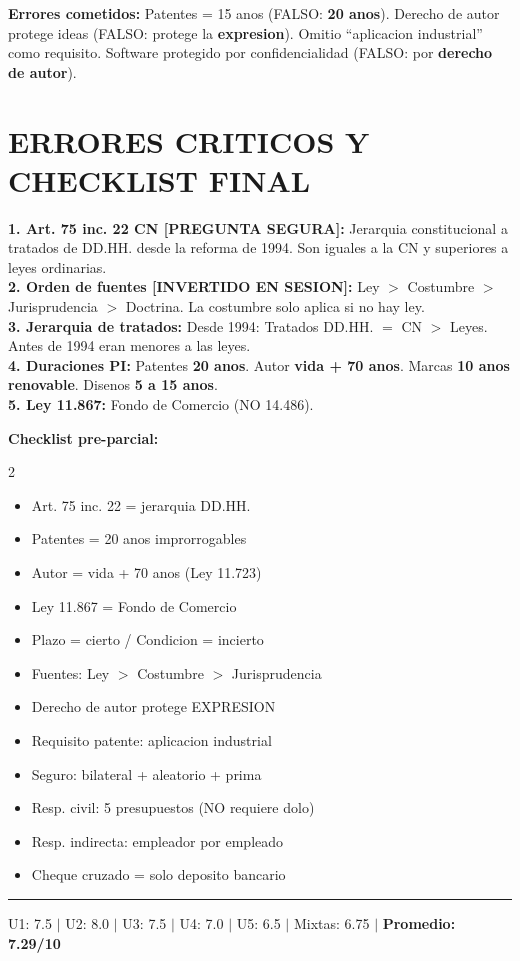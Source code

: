 \documentclass[10pt, a4paper]{article}
\newcommand{\mal}[1]{\textbf{\color{rojo}#1}}
\begin{document}
\begin{cajaError}
\mal{Errores cometidos:} Patentes = 15 anos (FALSO: \textbf{20 anos}). Derecho de autor protege ideas (FALSO: protege la \textbf{expresion}). Omitio ``aplicacion industrial'' como requisito. Software protegido por confidencialidad (FALSO: por \textbf{derecho de autor}).
\end{cajaError}

\section*{ERRORES CRITICOS Y CHECKLIST FINAL}

\begin{cajaError}
\mal{1. Art. 75 inc. 22 CN [PREGUNTA SEGURA]:} Jerarquia constitucional a tratados de DD.HH. desde la reforma de 1994. Son iguales a la CN y superiores a leyes ordinarias.\\
\mal{2. Orden de fuentes [INVERTIDO EN SESION]:} Ley $>$ Costumbre $>$ Jurisprudencia $>$ Doctrina. La costumbre solo aplica si no hay ley.\\
\mal{3. Jerarquia de tratados:} Desde 1994: Tratados DD.HH. $=$ CN $>$ Leyes. Antes de 1994 eran menores a las leyes.\\
\mal{4. Duraciones PI:} Patentes \textbf{20 anos}. Autor \textbf{vida + 70 anos}. Marcas \textbf{10 anos renovable}. Disenos \textbf{5 a 15 anos}.\\
\mal{5. Ley 11.867:} Fondo de Comercio (NO 14.486).
\end{cajaError}

\begin{cajaBien}
\textbf{Checklist pre-parcial:}
\begin{multicols}{2}
\begin{itemize}
  \item[$\square$] Art. 75 inc. 22 = jerarquia DD.HH.
  \item[$\square$] Patentes = 20 anos improrrogables
  \item[$\square$] Autor = vida + 70 anos (Ley 11.723)
  \item[$\square$] Ley 11.867 = Fondo de Comercio
  \item[$\square$] Plazo = cierto / Condicion = incierto
  \item[$\square$] Fuentes: Ley $>$ Costumbre $>$ Jurisprudencia
  \item[$\square$] Derecho de autor protege EXPRESION
  \item[$\square$] Requisito patente: aplicacion industrial
  \item[$\square$] Seguro: bilateral + aleatorio + prima
  \item[$\square$] Resp. civil: 5 presupuestos (NO requiere dolo)
  \item[$\square$] Resp. indirecta: empleador por empleado
  \item[$\square$] Cheque cruzado = solo deposito bancario
\end{itemize}
\end{multicols}
\end{cajaBien}

\vspace{3pt}\hrule\vspace{3pt}
\begin{center}
\small\color{gray} U1: 7.5 $|$ U2: 8.0 $|$ U3: 7.5 $|$ U4: 7.0 $|$ U5: 6.5 $|$ Mixtas: 6.75 $|$ \textbf{Promedio: 7.29/10}
\end{center}
\end{document}
